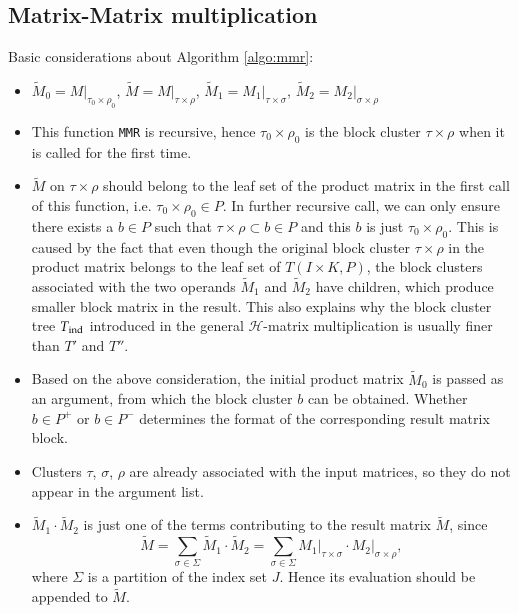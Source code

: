 \documentclass[11pt, a4paper]{book}
\begin{document}
\subsection{Matrix-Matrix multiplication}

Basic considerations about Algorithm \ref{algo:mmr}:
\begin{itemize}
\item $\widetilde{M}_0 = M\big\vert_{\tau_0\times\rho_0}$,
  $\widetilde{M} = M\big\vert_{\tau\times\rho}$,
  $\widetilde{M}_1 = M_1\big\vert_{\tau\times\sigma}$,
  $\widetilde{M}_2 = M_2\big\vert_{\sigma\times\rho}$
\item This function \texttt{MMR} is recursive, hence $\tau_0\times\rho_0$ is the block cluster
  $\tau\times\rho$ when it is called for the first time.
\item $\widetilde{M}$ on $\tau\times\rho$ should belong to the leaf set of the product matrix
  in the first call of this function, i.e. $\tau_0\times\rho_0 \in P$. In further recursive
  call, we can only ensure there exists a $b \in P$ such that $\tau\times\rho \subset b \in P$
  and this $b$ is just $\tau_0\times\rho_0$. This is caused by the fact that even though the
  original block cluster $\tau\times\rho$ in the product matrix belongs to the leaf set of
  $T(I\times K, P)$, the block clusters associated with the two operands $\widetilde{M}_1$ and
  $\widetilde{M}_2$ have children, which produce smaller block matrix in the result. This also
  explains why the block cluster tree $T_{\rm ind}$ introduced in the general
  $\mathcal{H}$-matrix multiplication is usually finer than $T'$ and $T''$.
\item Based on the above consideration, the initial product matrix $\widetilde{M}_0$ is passed
  as an argument, from which the block cluster $b$ can be obtained. Whether $b \in P^+$ or
  $b \in P^-$ determines the format of the corresponding result matrix block.
\item Clusters $\tau$, $\sigma$, $\rho$ are already associated with the input matrices, so
  they do not appear in the argument list.
\item $\widetilde{M}_1 \cdot \widetilde{M}_2$ is just one of the terms contributing to the
  result matrix $\widetilde{M}$, since
  $$
  \widetilde{M} = \sum_{\sigma\in\Sigma}\widetilde{M}_1 \cdot \widetilde{M}_2 =
  \sum_{\sigma\in\Sigma} M_1\big\vert_{\tau\times\sigma} \cdot
  M_2\big\vert_{\sigma\times\rho},
  $$
  where $\Sigma$ is a partition of the index set $J$. Hence its evaluation should be appended
  to $\widetilde{M}$.
\end{itemize}
\end{document}
